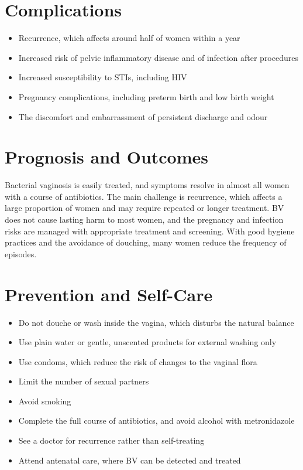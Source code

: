 \section*{Complications}
\begin{itemize}
    \item Recurrence, which affects around half of women within a year
    \item Increased risk of pelvic inflammatory disease and of infection after procedures
    \item Increased susceptibility to STIs, including HIV
    \item Pregnancy complications, including preterm birth and low birth weight
    \item The discomfort and embarrassment of persistent discharge and odour
\end{itemize}

\section*{Prognosis and Outcomes}
Bacterial vaginosis is easily treated, and symptoms resolve in almost all women with a course of antibiotics. The main challenge is recurrence, which affects a large proportion of women and may require repeated or longer treatment. BV does not cause lasting harm to most women, and the pregnancy and infection risks are managed with appropriate treatment and screening. With good hygiene practices and the avoidance of douching, many women reduce the frequency of episodes.

\section*{Prevention and Self-Care}
\begin{itemize}
    \item Do not douche or wash inside the vagina, which disturbs the natural balance
    \item Use plain water or gentle, unscented products for external washing only
    \item Use condoms, which reduce the risk of changes to the vaginal flora
    \item Limit the number of sexual partners
    \item Avoid smoking
    \item Complete the full course of antibiotics, and avoid alcohol with metronidazole
    \item See a doctor for recurrence rather than self-treating
    \item Attend antenatal care, where BV can be detected and treated
\end{itemize}

